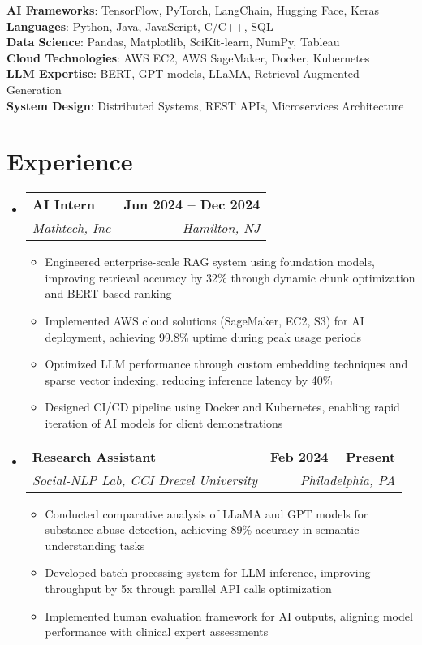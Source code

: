 \documentclass[letterpaper,11pt]{article}
\makeatletter
\newcommand{\resumeItem}[1]{
  \item\small{
    {#1 \vspace{-2pt}}
  }
}
\newcommand{\resumeSubheading}[4]{
  \vspace{-2pt}\item
    \begin{tabular*}{1.0\textwidth}[t]{l@{\extracolsep{\fill}}r}
      \textbf{#1} & \textbf{\small #2} \\
      \textit{\small#3} & \textit{\small #4} \\
    \end{tabular*}\vspace{-7pt}
}
\newcommand{\resumeSubHeadingListStart}{\begin{itemize}[leftmargin=0.0in, label={}]}
\newcommand{\resumeSubHeadingListEnd}{\end{itemize}}
\newcommand{\resumeItemListStart}{\begin{itemize}}
\newcommand{\resumeItemListEnd}{\end{itemize}\vspace{-5pt}}
\makeatother
\begin{document}
\begin{itemize}[leftmargin=0.15in, label={}]
	\small{\item{
		\textbf{AI Frameworks}{: TensorFlow, PyTorch, LangChain, Hugging Face, Keras} \\
		\textbf{Languages}{: Python, Java, JavaScript, C/C++, SQL} \\
		\textbf{Data Science}{: Pandas, Matplotlib, SciKit-learn, NumPy, Tableau} \\
		\textbf{Cloud Technologies}{: AWS EC2, AWS SageMaker, Docker, Kubernetes} \\
		\textbf{LLM Expertise}{: BERT, GPT models, LLaMA, Retrieval-Augmented Generation} \\
            \textbf{System Design}{: Distributed Systems, REST APIs, Microservices Architecture}}
	}
\end{itemize}
\vspace{-15pt}

\section{Experience}
  \resumeSubHeadingListStart
    \resumeSubheading
    {AI Intern}{Jun 2024 -- Dec 2024}
    {Mathtech, Inc}{Hamilton, NJ}
    \resumeItemListStart
        \resumeItem{Engineered enterprise-scale RAG system using foundation models, improving retrieval accuracy by 32\% through dynamic chunk optimization and BERT-based ranking}
        \resumeItem{Implemented AWS cloud solutions (SageMaker, EC2, S3) for AI deployment, achieving 99.8\% uptime during peak usage periods}
        \resumeItem{Optimized LLM performance through custom embedding techniques and sparse vector indexing, reducing inference latency by 40\%}
        \resumeItem{Designed CI/CD pipeline using Docker and Kubernetes, enabling rapid iteration of AI models for client demonstrations}
    \resumeItemListEnd
    
    \resumeSubheading
    {Research Assistant}{Feb 2024 -- Present}
    {Social-NLP Lab, CCI Drexel University}{Philadelphia, PA}
    \resumeItemListStart
        \resumeItem{Conducted comparative analysis of LLaMA and GPT models for substance abuse detection, achieving 89\% accuracy in semantic understanding tasks}
        \resumeItem{Developed batch processing system for LLM inference, improving throughput by 5x through parallel API calls optimization}
        \resumeItem{Implemented human evaluation framework for AI outputs, aligning model performance with clinical expert assessments}
    \resumeItemListEnd
\resumeSubHeadingListEnd
\vspace{-15pt}
\end{document}
